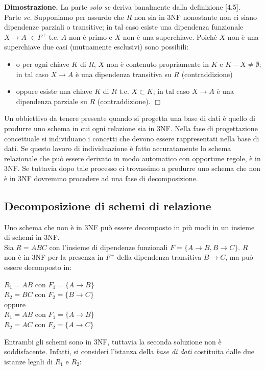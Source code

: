 \textbf{Dimostrazione.} La parte \emph{solo se} deriva banalmente dalla definizione [4.5].\\
Parte \emph{se.} Supponiamo per assurdo che $R$ non sia in 3NF nonostante non ci siano
dipendenze parziali o transitive; in tal caso esiste una dipendenza funzionale $X\rightarrow A$
$\in F^+$ t.c. $A$ non è primo e $X$ non è una superchiave. Poiché $X$ non è una
superchiave due casi (mutuamente esclusivi) sono possibili:
\begin{itemize}
 \item o per ogni chiave $K$ di $R$, $X$ non è contenuto propriamente in $K$ e $K-X \neq 
 \emptyset$; in tal caso $X\rightarrow A$ è una dipendenza transitiva su $R$ (contraddizione)
 \item oppure esiste una chiave $K$ di $R$ t.c. $X \subset K$; in tal caso $X\rightarrow A$ 
 è una dipendenza parziale su $R$ (contraddizione). $\Box$
\end{itemize}
Un obbiettivo da tenere presente quando si progetta una base di dati è quello di produrre 
uno schema in cui ogni relazione sia in 3NF. Nella fase di progettazione concettuale si 
individuano i concetti che devono essere rappresentati nella base di dati. Se questo lavoro 
di individuazione è fatto accuratamente lo schema relazionale che può essere derivato in modo
automatico con opportune regole, è in 3NF. Se tuttavia dopo tale processo ci trovassimo a 
produrre uno schema che non è in 3NF dovremmo procedere ad una fase di decomposizione.

\subsection{Decomposizione di schemi di relazione}
Uno schema che non è in 3NF può essere decomposto in più modi in un insieme di schemi in 3NF.\\
 Sia $R = ABC$ con l'insieme di dipendenze funzionali $F = \{A\rightarrow B, B\rightarrow C\}$.
$R$ non è in 3NF per la presenza in $F^+$ della dipendenza transitiva $B\rightarrow C$, ma può 
essere decomposto in:
\begin{center}
  $R_1 = AB$ con $F_1=\{A\rightarrow B\}$\\
  $R_2 = BC$ con $F_2=\{B\rightarrow C\}$\\
  oppure\\
  $R_1 = AB$ con $F_1=\{A\rightarrow B\}$\\
  $R_2 = AC$ con $F_2=\{A\rightarrow C\}$\\
\end{center}
Entrambi gli schemi sono in 3NF, tuttavia la seconda soluzione non è soddisfacente. Infatti,
si consideri l’istanza della \emph{base di dati} costituita dalle due istanze legali di $R_1$ e $R_2$:

